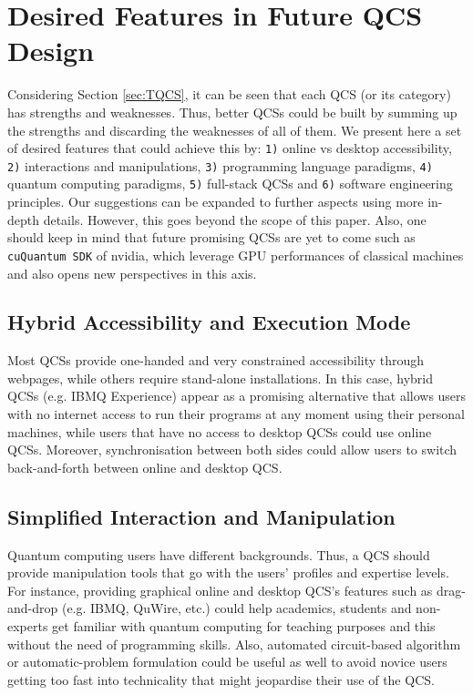\documentclass[conference]{IEEEtran}
\begin{document}
\section{Desired Features in Future QCS Design \label{sec:TRFQD}}
Considering Section \ref{sec:TQCS}, it can be seen that each QCS (or its category) has strengths and weaknesses. Thus, better QCSs could be built by summing up the strengths and discarding the weaknesses of all of them. We present here a set of desired features that could achieve this by: \texttt{1)} online vs desktop accessibility, \texttt{2)} interactions and manipulations, \texttt{3)} programming language paradigms, \texttt{4)} quantum computing paradigms, \texttt{5)} full-stack QCSs and \texttt{6)} software engineering principles. Our suggestions can be expanded to further aspects using more in-depth details. However, this goes beyond the scope of this paper. Also, one should keep in mind that future promising QCSs are yet to come such as \texttt{cuQuantum SDK} of nvidia, which leverage GPU performances of classical machines and also opens new perspectives in this axis.

\subsection{Hybrid Accessibility and Execution Mode}

Most QCSs provide one-handed and very constrained accessibility through webpages, while others require stand-alone installations. In this case, hybrid QCSs (e.g. IBMQ Experience) appear as a promising alternative that allows users with no internet access to run their programs at any moment using their personal machines, while users that have no access to desktop QCSs could use online QCSs. Moreover, synchronisation between both sides could allow users to switch back-and-forth between online and desktop QCS.  

\subsection{Simplified Interaction and Manipulation} 
Quantum computing users have different backgrounds. Thus, a QCS should provide manipulation tools that go with the users' profiles and expertise levels. For instance, providing graphical online and desktop QCS's features such as drag-and-drop (e.g. IBMQ, QuWire, etc.) could help academics, students and non-experts get familiar with quantum computing for teaching purposes and this without the need of programming skills.  Also, automated circuit-based algorithm or automatic-problem formulation could be useful as well to avoid novice users getting too fast into technicality that might jeopardise their use of the QCS.   
\end{document}
